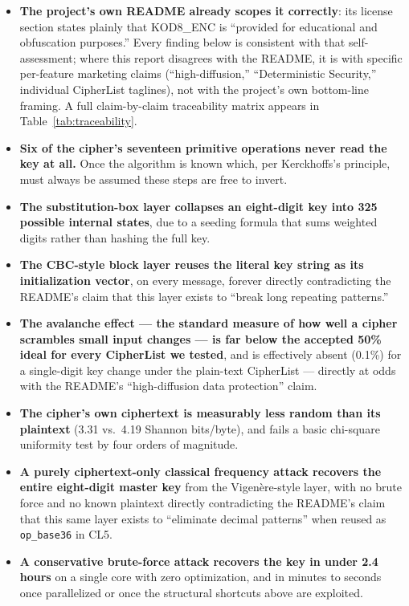 \documentclass[11pt]{article}
\begin{document}
\begin{itemize}[leftmargin=1.6em]
\item \textbf{The project's own README already scopes it correctly}:
its license section states plainly that KOD8\_ENC is ``provided for
educational and obfuscation purposes.'' Every finding below is
consistent with that self-assessment; where this report disagrees with
the README, it is with specific per-feature marketing claims
(``high-diffusion,'' ``Deterministic Security,'' individual
CipherList taglines), not with the project's own bottom-line framing.
A full claim-by-claim traceability matrix appears in
Table~\ref{tab:traceability}.
\item \textbf{Six of the cipher's seventeen primitive operations never
read the key at all.} Once the algorithm is known which, per
Kerckhoffs's principle, must always be assumed these steps are free
to invert.
\item \textbf{The substitution-box layer collapses an eight-digit key
into 325 possible internal states}, due to a seeding formula that sums
weighted digits rather than hashing the full key.
\item \textbf{The CBC-style block layer reuses the literal key string
as its initialization vector}, on every message, forever directly
contradicting the README's claim that this layer exists to ``break
long repeating patterns.''
\item \textbf{The avalanche effect --- the standard measure of how well a
cipher scrambles small input changes --- is far below the accepted 50\%
ideal for every CipherList we tested}, and is effectively absent
(0.1\%) for a single-digit key change under the plain-text CipherList ---
directly at odds with the README's ``high-diffusion data protection''
claim.
\item \textbf{The cipher's own ciphertext is measurably less random
than its plaintext} (3.31 vs.\ 4.19 Shannon bits/byte), and fails a
basic chi-square uniformity test by four orders of magnitude.
\item \textbf{A purely ciphertext-only classical frequency attack
recovers the entire eight-digit master key} from the Vigen\`ere-style
layer, with no brute force and no known plaintext directly
contradicting the README's claim that this same layer exists to
``eliminate decimal patterns'' when reused as \texttt{op\_base36} in CL5.
\item \textbf{A conservative brute-force attack recovers the key in
under 2.4 hours} on a single core with zero optimization, and in
minutes to seconds once parallelized or once the structural shortcuts
above are exploited.
\end{itemize}
\end{document}

